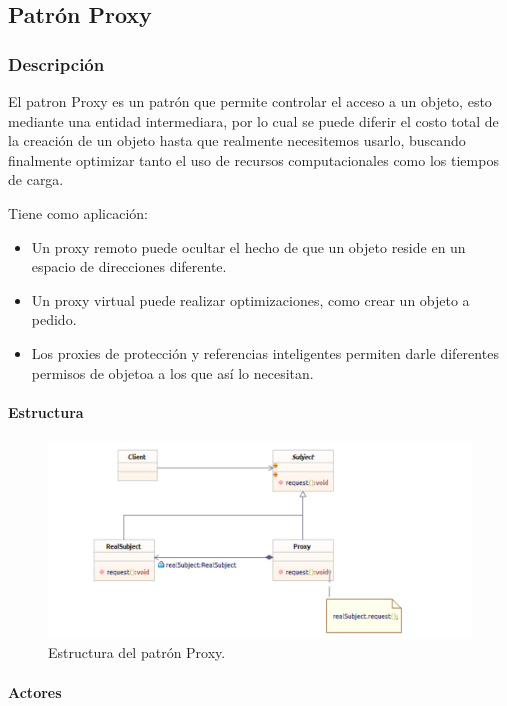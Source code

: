 \subsection{Patrón Proxy}

\subsubsection{Descripción}
El patron Proxy es un patrón que permite controlar el acceso a un objeto, esto  mediante una entidad intermediara, por lo cual se puede diferir el costo total de la creación de un objeto hasta que realmente necesitemos usarlo, buscando finalmente optimizar tanto el uso de recursos computacionales como los tiempos de carga.

Tiene como aplicación:

\begin{itemize}
	\item Un proxy remoto puede ocultar el hecho de que un objeto reside en un espacio de direcciones diferente.
	\item Un proxy virtual puede realizar optimizaciones, como crear un objeto a pedido.
	\item Los proxies de protección y referencias inteligentes permiten darle diferentes permisos de objetoa a los que así lo necesitan.
\end{itemize}

\paragraph{Estructura}

\begin{figure}[th!]
	\centering
	\includegraphics[width=.8\linewidth]{imagenes/Patrones/Proxy.pdf}
	\caption{Estructura del patrón Proxy.\cite{gof}}	
\end{figure}

\paragraph{Actores}

